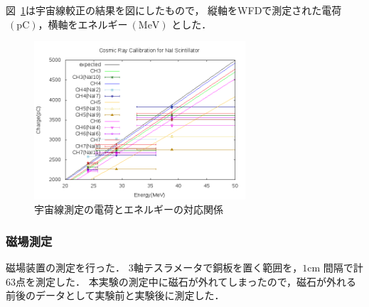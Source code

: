 図~\ref{cali}は宇宙線較正の結果を図にしたもので，
縦軸をWFDで測定された電荷$~(\mathrm{pC})$，横軸をエネルギー$~(\mathrm{MeV})$ とした．
\begin{figure}[H]
  \centering
      \includegraphics[width=0.7\textwidth]{figure/tajima/fit.png}
      \caption{宇宙線測定の電荷とエネルギーの対応関係}\label{cali}
\end{figure}
\newpage
\subsubsection{磁場測定}
磁場装置の測定を行った．
3軸テスラメータで銅板を置く範囲を，$1\mathrm{cm}$ 間隔で計63点を測定した．
本実験の測定中に磁石が外れてしまったので，磁石が外れる前後のデータとして実験前と実験後に測定した．

